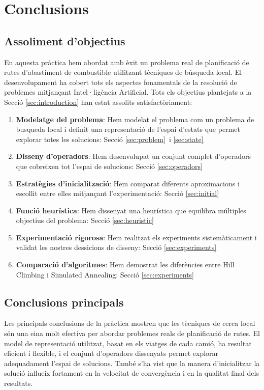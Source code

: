 \section{Conclusions}
\label{sec:conclusions}

\subsection{Assoliment d'objectius}

En aquesta pràctica hem abordat amb èxit un problema real de planificació de rutes d'abastiment de combustible utilitzant tècniques de búsqueda local. El desenvolupament ha cobert tots els aspectes fonamentals de la resolució de problemes mitjançant Intel·ligència Artificial. Tots els objectius plantejats a la Secció \ref{sec:introduction} han estat assolits satisfactòriament:

\begin{enumerate}
    \item \textbf{Modelatge del problema}: Hem modelat el problema com un problema de busqueda local i definit una representació de l'espai d'estats que permet explorar totes les solucions: Secció \ref{sec:problem}\ i \ref{sec:state} \
    
    \item \textbf{Disseny d'operadors}: Hem desenvolupat un conjunt complet d'operadors que cobreixen tot l'espai de solucions: Secció  \ref{sec:operadors} \
    
    \item \textbf{Estratègies d'inicialització}: Hem comparat diferents aproximacions i escollit entre elles mitjançant l'experimentació: Secció \ref{sec:initial} \
    
    \item \textbf{Funció heurística}: Hem dissenyat una heurística que equilibra múltiples objectius del problema: Secció \ref{sec:heuristic} \
    
    \item \textbf{Experimentació rigorosa}: Hem realitzat els experiments sistemàticament i validat les nostres dessicions de disseny: Secció  \ref{sec:experiments} \
    
    \item \textbf{Comparació d'algoritmes}: Hem demostrat les diferències entre Hill Climbing i Simulated Annealing: Secció \ref{sec:experiments} \
    
\end{enumerate}


\subsection{Conclusions principals}
Les principals conclusions de la pràctica mostren que les tècniques de cerca local són una eina molt efectiva per abordar problemes reals de planificació de rutes. El model de representació utilitzat, basat en els viatges de cada camió, ha resultat eficient i flexible, i el conjunt d’operadors dissenyats permet explorar adequadament l’espai de solucions. També s’ha vist que la manera d’inicialitzar la solució influeix fortament en la velocitat de convergència i en la qualitat final dels resultats. \\

